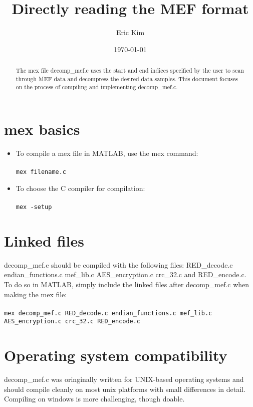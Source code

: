 \documentclass{article}
\begin{document}
\title{Directly reading the MEF format}
\author{Eric Kim}
\date{\today}
\maketitle
\begin{abstract}
The mex file decomp\_mef.c uses the start and end indices specified by the user to scan through MEF data and decompress the desired data samples. This document focuses on the process of compiling and implementing decomp\_mef.c.
\end{abstract}
\section{mex basics}
\begin{itemize}
\item
To compile a mex file in MATLAB, use the mex command:\\
\\
\texttt{mex filename.c}
\item
To choose the C compiler for compilation:\\
\\
\texttt{mex -setup}
\end{itemize}
\section{Linked files}
decomp\_mef.c should be compiled with the following files: RED\_decode.c endian\_functions.c mef\_lib.c AES\_encryption.c crc\_32.c and RED\_encode.c. To do so in MATLAB, simply include the linked files after decomp\_mef.c when making the mex file:\\
\\
\texttt{mex decomp\_mef.c RED\_decode.c endian\_functions.c mef\_lib.c\\ AES\_encryption.c crc\_32.c RED\_encode.c}
\section{Operating system compatibility}
 decomp\_mef.c was oringinally written for UNIX-based operating systems and should compile  cleanly on most unix platforms with small differences in detail. Compiling on windows is more challenging, though doable.
\end{document}
